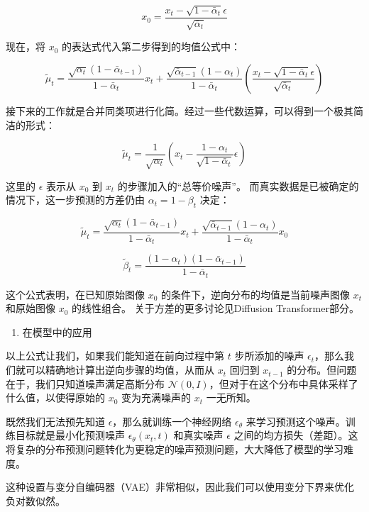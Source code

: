 \[
x_0=\frac{x_t-\sqrt{1-\bar{\alpha}_t}\epsilon}{\sqrt{\bar{\alpha}_t}}
\]

现在，将 \(x_0\) 的表达式代入第二步得到的均值公式中：

\[
\tilde{\mu}_t=
\frac{\sqrt{\alpha_t}(1-\bar{\alpha}_{t-1})}{1-\bar{\alpha}_t}x_t
+\frac{\sqrt{\bar{\alpha}_{t-1}}(1-\alpha_t)}{1-\bar{\alpha}_t}
\left(\frac{x_t-\sqrt{1-\bar{\alpha}_t}\epsilon}{\sqrt{\bar{\alpha}_t}}\right)
\]

接下来的工作就是合并同类项进行化简。经过一些代数运算，可以得到一个极其简洁的形式：

\[
\tilde{\mu}_t=\frac{1}{\sqrt{\alpha_t}}
\left(x_t-\frac{1-\alpha_t}{\sqrt{1-\bar{\alpha}_t}}\epsilon\right)
\]

这里的 \(\epsilon\) 表示从 \(x_0\) 到 \(x_t\) 的步骤加入的``总等价噪声''。
而真实数据是已被确定的情况下，这一步预测的方差仍由 \(\alpha_t=1-\beta_t\) 决定：

\[
\tilde{\mu}_t=
\frac{\sqrt{\alpha_t}(1-\bar{\alpha}_{t-1})}{1-\bar{\alpha}_t}x_t
+\frac{\sqrt{\bar{\alpha}_{t-1}}(1-\alpha_t)}{1-\bar{\alpha}_t}x_0
\]

\[
\tilde{\beta}_t=\frac{(1-\alpha_t)(1-\bar{\alpha}_{t-1})}{1-\bar{\alpha}_t}
\]

这个公式表明，在已知原始图像 \(x_0\) 的条件下，逆向分布的均值是当前噪声图像 \(x_t\) 和原始图像 \(x_0\) 的线性组合。
关于方差的更多讨论见Diffusion Transformer部分。

\begin{enumerate}
\def\labelenumi{\arabic{enumi}.}
\setcounter{enumi}{1}
\tightlist
\item
  在模型中的应用
\end{enumerate}

以上公式让我们，如果我们能知道在前向过程中第 \(t\) 步所添加的噪声 \(\epsilon_t\)，那么我们就可以精确地计算出逆向步骤的均值，从而从 \(x_t\) 回归到 \(x_{t-1}\) 的分布。但问题在于，我们只知道噪声满足高斯分布 \(\mathcal{N}(0,I)\)，但对于在这个分布中具体采样了什么值，以使得原始的 \(x_0\) 变为充满噪声的 \(x_t\) 一无所知。

既然我们无法预先知道 \(\epsilon\)，那么就训练一个神经网络 \(\epsilon_\theta\) 来学习预测这个噪声。训练目标就是最小化预测噪声 \(\epsilon_\theta(x_t,t)\) 和真实噪声 \(\epsilon\) 之间的均方损失（差距）。这将复杂的分布预测问题转化为更稳定的噪声预测问题，大大降低了模型的学习难度。

这种设置与变分自编码器（VAE）非常相似，因此我们可以使用变分下界来优化负对数似然。

